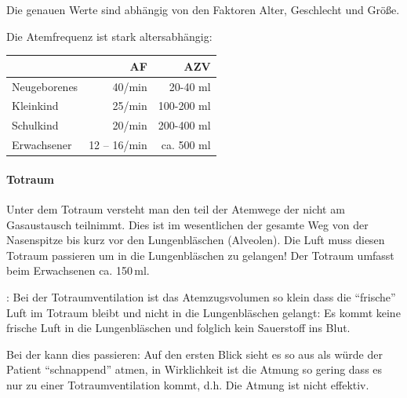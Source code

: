 Die genauen Werte sind abhängig von den Faktoren Alter,
Geschlecht und Größe. 






Die Atemfrequenz ist stark altersabhängig:



\begin{table}[H]
\begin{center}
\begin{tabular}{lrr}
\toprule
 & AF &  AZV
\\\midrule
Neugeborenes & 40/min & 20-40 ml 
\\
Kleinkind & 25/min & 100-200 ml
\\
Schulkind & 20/min & 200-400 ml
\\
Erwachsener & 12 -- 16/min  & ca. 500 ml
\\\bottomrule
\end{tabular}
\end{center}
\end{table}




\paragraph{Totraum} Unter dem Totraum
versteht man den teil der Atemwege der nicht am Gasaustausch teilnimmt.
Dies ist im wesentlichen der gesamte Weg von der
Nasenspitze bis kurz vor den Lungenbläschen (Alveolen). Die
Luft muss diesen Totraum passieren um in die Lungenbläschen
zu gelangen! Der Totraum umfasst beim Erwachsenen ca.
150\,ml.\cite{KlinkePhysio3}

: Bei der
Totraumventilation ist das Atemzugsvolumen so klein dass
die "`frische"' Luft im Totraum bleibt und nicht in die
Lungenbläschen gelangt: Es kommt keine frische Luft in die
Lungenbläschen und folglich kein Sauerstoff ins Blut.

Bei der  kann dies
passieren: Auf den ersten Blick sieht es so aus als würde
der Patient "`schnappend"' atmen, in Wirklichkeit ist die
Atmung so gering dass es nur zu einer Totraumventilation
kommt, d.h. Die Atmung ist nicht effektiv. 

